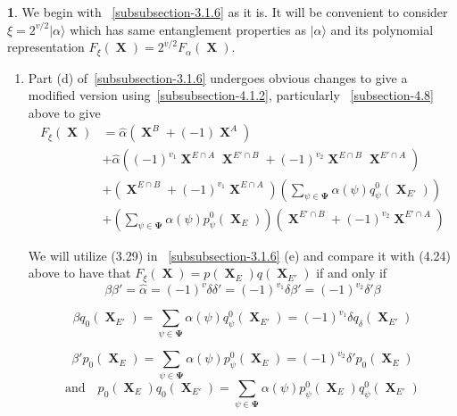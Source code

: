 \documentclass[a4paper,12pt]{article}
\DeclareMathOperator{\x}{\mathrm{X}}
\theoremstyle{definition}
\theoremstyle{underlinethm}
\theoremstyle{definition}
\newtheorem{subsubsec}{}[subsection]
\begin{document}
\begin{subsubsec}\label{subsubsection-4.3.1}
We begin with ~\eqref{subsubsection-3.1.6} as it is. It will be convenient to consider $\xi = 2^{v/2} | \alpha \rangle$ which has same entanglement properties as $| \alpha \rangle $ and its polynomial representation $F_{\xi}(\boldsymbol{\x}) =2^{v/2}F_{\alpha}(\boldsymbol{\x})$. 
\end{subsubsec}
\begin{enumerate}[label=(\alph*)]
\item Part (d) of~\eqref{subsubsection-3.1.6} undergoes obvious changes to give a modified version using~\eqref{subsubsection-4.1.2}, particularly ~\eqref{subsection-4.8} above to give
\begin{align*}
F_{\xi}(\boldsymbol{\x}) &= \hat{\alpha}\left(\boldsymbol{\x}^{B} + (-1) \boldsymbol{\x}^{A}\right)\\
 & + \hat{\alpha}\left((-1)^{v_{1}} \boldsymbol{\x}^{E \cap A} \boldsymbol{\x}^{E' \cap B} + (-1)^{v_{2}} \boldsymbol{\x}^{E \cap B} \boldsymbol{\x}^{E' \cap A}\right)\\
 & + \left(\boldsymbol{\x}^{E \cap B} + (-1)^{v_{1}} \boldsymbol{\x}^{E \cap A}\right) \left(\sum_{\psi \in \boldsymbol{\Psi}} \alpha(\psi) q_{\psi}^{0} (\boldsymbol{\x}_{E'}) \right)\\
 & + \left(\sum_{\psi \in \boldsymbol{\Psi}} \alpha (\psi) p_{\psi}^{0} (\boldsymbol{\x}_{E}) \right) \left(\boldsymbol{\x}^{E' \cap B} + (-1)^{v_{2}} \boldsymbol{\x}^{E' \cap A} \right)\tag{4.25}\label{eq-4.25}
\end{align*}

We will utilize (3.29) in ~\eqref{subsubsection-3.1.6} (e) and compare it with (4.24) above to have that $F_{\xi}(\boldsymbol{\x}) = p(\boldsymbol{\x}_{E}) q(\boldsymbol{\x}_{E'})$ if and only if 
\begin{equation}
\beta\beta' = \hat{\alpha} = (-1)^{v} \delta \delta' = (-1)^{v_{1}} \delta\beta' = (-1)^{v_{2}} \delta' \beta\tag{4.26}\label{eq-4.26}
\end{equation}

\begin{equation}
\beta q_{0} (\boldsymbol{\x}_{E'}) = \sum_{\psi \in \boldsymbol{\Psi}} \alpha (\psi) q_{\psi}^{0} (\boldsymbol{\x}_{E'}) = (-1)^{v_{1}} \delta q_{\delta} (\boldsymbol{\x}_{E'})\tag{4.27}\label{eq-4.27}
\end{equation}

\begin{equation}
\beta' p_{0} (\boldsymbol{\x}_{E}) = \sum_{\psi \in \boldsymbol{\Psi}} \alpha (\psi) p_{\psi}^{0} (\boldsymbol{\x}_{E}) = (-1)^{v_{2}} \delta' p_{0} (\boldsymbol{\x}_{E})\tag{4.28}\label{eq-4.28}
\end{equation}
\begin{equation}
\text{and}\quad p_{0}(\boldsymbol{\x}_{E}) q_{0}(\boldsymbol{\x}_{E'}) = \sum_{\psi \in \boldsymbol{\Psi}} \alpha (\psi) p_{\psi}^{0} (\boldsymbol{\x}_{E}) q_{\psi}^{0} (\boldsymbol{\x}_{E'})\tag{4.29}\label{eq-4.29}
\end{equation}


\end{enumerate}
\end{document}

